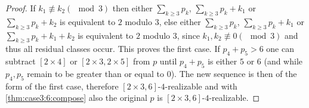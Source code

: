 \begin{theorem}
\begin{proof}
    If $k_1 \not\equiv k_2 (\mod 3)$ then either $\sum_{k\geq 3} p_k$, $\sum_{k\geq 3} p_k + k_1$ or $\sum_{k\geq 3} p_k + k_2$ is equivalent to $2$ modulo $3$, else either $\sum_{k\geq 3} p_k$, $\sum_{k\geq 3} p_k + k_1$ or $\sum_{k\geq 3} p_k + k_1 + k_2$ is equivalent to $2$ modulo $3$, since $k_1, k_2 \not\equiv 0 (\mod 3)$ and thus all residual classes occur. This proves the first case. If $p_4 + p_5 > 6$ one can subtract $[2 \times 4]$ or $[2 \times 3, 2 \times 5]$ from $p$ until $p_4 + p_5$ is either $5$ or $6$ (and while $p_4, p_5$ remain to be greater than or equal to $0$). The new sequence is then of the form of the first case, therefore $[2 \times 3, 6]$-$4$-realizable and with \autoref{thm:case3:6:compose} also the original $p$ is $[2 \times 3, 6]$-$4$-realizable.
  \end{proof}
\end{theorem}



